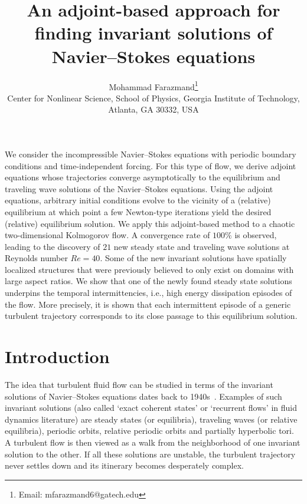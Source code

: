 \documentclass{article}
\begin{document}
\title {
An adjoint-based approach for finding invariant
solutions of Navier--Stokes equations}
\author{
Mohammad Farazmand\thanks{Email: mfarazmand6@gatech.edu}\\
 Center for Nonlinear Science,
 School of Physics,
 Georgia Institute of Technology,
 Atlanta, GA  30332, USA
}
\date{}                     %
\setcounter{Maxaffil}{0}
\renewcommand\Affilfont{\itshape\small}
\maketitle

We consider the incompressible Navier--Stokes equations with periodic boundary conditions and
time-independent forcing. For this type of flow, we derive adjoint equations whose
trajectories
converge asymptotically to the equilibrium and traveling wave solutions
of the Navier--Stokes equations. Using the adjoint equations,
arbitrary initial conditions evolve
to the vicinity of a (relative) equilibrium at which point a few
Newton-type iterations yield the desired (relative) equilibrium solution. We apply this
adjoint-based method
to a chaotic two-dimensional Kolmogorov flow. A convergence rate of $100\%$ is observed,
leading to the discovery
of $21$ new steady state and traveling wave solutions at Reynolds number $Re=40$.
Some of the new invariant solutions have spatially localized structures
that were previously believed to only exist on domains with large aspect ratios.
We show that one of the newly found
steady state solutions underpins the temporal intermittencies, i.e., high energy
dissipation episodes
of the flow. More precisely, it is shown that each intermittent episode of a generic turbulent
trajectory
corresponds to its close passage to this equilibrium solution.

\section{Introduction}\label{s:intro}
The idea that turbulent fluid flow can be studied in terms of
the invariant solutions of Navier--Stokes equations dates back to
1940s~\citep{hopf48}. Examples of such invariant solutions (also called
`exact coherent states' or `recurrent flows' in fluid dynamics
literature) are
steady states (or equilibria), traveling waves
(or relative equilibria), periodic orbits, relative periodic orbits and
partially hyperbolic tori.
A turbulent flow is then viewed as a walk from the neighborhood of
one invariant solution to the other. If all these solutions are unstable,
the turbulent trajectory never settles down and its itinerary becomes
desperately complex.
\end{document}
